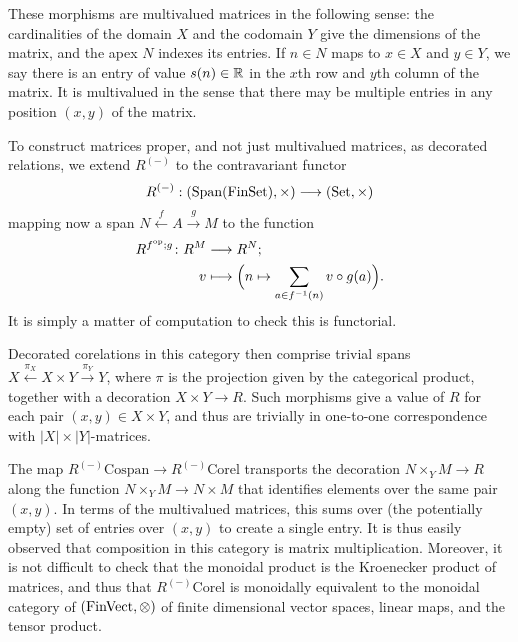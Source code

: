 These morphisms are multivalued matrices in the following sense: the
cardinalities of the domain $X$ and the codomain $Y$ give the dimensions of the
matrix, and the apex $N$ indexes its entries. If $n \in N$ maps to $x \in X$ and
$y \in Y$, we say there is an entry of value $s(n) \in {\mathbb{R}}$ in the $x$th row and
$y$th column of the matrix. It is multivalued in the sense that there may be
multiple entries in any position $(x,y)$ of the matrix.


To construct matrices proper, and not just multivalued matrices, as decorated
relations, we extend $R^{(-)}$ to the contravariant functor
\[
  R^{(-)}: (\mathrm{Span(FinSet)},\times) \longrightarrow (\mathrm{Set},\times)
\]
mapping now a span $N \stackrel{f}\leftarrow A \stackrel{g}\to M$ to the
function
\begin{align*}
  R^{f^{\mathrm{op}};g}{\colon} R^M &\longrightarrow R^N; \\
  v &\longmapsto \Big(n \mapsto \sum_{a \in f^{-1}(n)} v\circ g(a)\Big).
\end{align*}
It is simply a matter of computation to check this is functorial.

Decorated corelations in this category then comprise trivial spans $X
\xleftarrow{\pi_X} X \times Y \xrightarrow{\pi_Y} Y$, where $\pi$ is the
projection given by the categorical product, together with a decoration $X\times
Y \to R$. Such morphisms give a value of $R$ for each pair $(x,y) \in X \times
Y$, and thus are trivially in one-to-one correspondence with $\lvert X \rvert
\times \lvert Y\rvert$-matrices. 

The map $R^{(-)}\mathrm{Cospan} \to R^{(-)}\mathrm{Corel}$ transports the
decoration $N\times_YM \to R$ along the function $N \times_YM \to N \times M$
that identifies elements over the same pair $(x,y)$. In terms of the multivalued
matrices, this sums over (the potentially empty) set of entries over $(x,y)$ to
create a single entry. It is thus easily observed that composition in this
category is matrix multiplication. Moreover, it is not difficult to check that
the monoidal product is the Kroenecker product of matrices, and thus that
$R^{(-)}\mathrm{Corel}$ is monoidally equivalent to the monoidal category of
$(\mathrm{FinVect}, \otimes)$ of finite dimensional vector spaces, linear maps, and the
tensor product.


